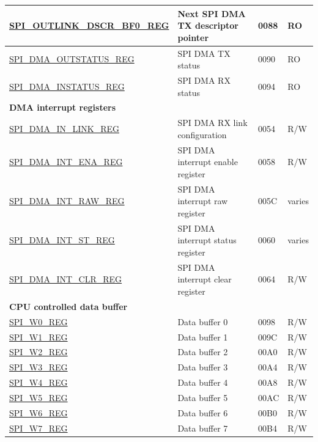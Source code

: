 \begin{longtable}{ | p{6cm} | p{7.2cm} | p{1.3cm} | p{1cm} | }
\hyperref[regdesc:SPIOUTLINKDSCRBF0REG]{SPI\_OUTLINK\_DSCR\_BF0\_REG} & Next SPI DMA TX descriptor pointer & \hexprefix{}0088 & RO \\ \hline
\hyperref[regdesc:SPIDMAOUTSTATUSREG]{SPI\_DMA\_OUTSTATUS\_REG} & SPI DMA TX status & \hexprefix{}0090 & RO \\ \hline
\hyperref[regdesc:SPIDMAINSTATUSREG]{SPI\_DMA\_INSTATUS\_REG} & SPI DMA RX status & \hexprefix{}0094 & RO \\ \hline
\multicolumn{4}{|l|}{\textbf{DMA interrupt registers}} \\ \hline
\hyperref[regdesc:SPIDMAINLINKREG]{SPI\_DMA\_IN\_LINK\_REG} & SPI DMA RX link configuration & \hexprefix{}0054 & R/W \\ \hline
\hyperref[regdesc:SPIDMAINTENAREG]{SPI\_DMA\_INT\_ENA\_REG} & SPI DMA interrupt enable register & \hexprefix{}0058 & R/W \\ \hline
\hyperref[regdesc:SPIDMAINTRAWREG]{SPI\_DMA\_INT\_RAW\_REG} & SPI DMA interrupt raw register & \hexprefix{}005C & varies \\ \hline
\hyperref[regdesc:SPIDMAINTSTREG]{SPI\_DMA\_INT\_ST\_REG} & SPI DMA interrupt status register & \hexprefix{}0060 & varies \\ \hline
\hyperref[regdesc:SPIDMAINTCLRREG]{SPI\_DMA\_INT\_CLR\_REG} & SPI DMA interrupt clear register & \hexprefix{}0064 & R/W \\ \hline
\multicolumn{4}{|l|}{\textbf{CPU controlled data buffer}} \\ \hline
\hyperref[regdesc:SPIW0REG]{SPI\_W0\_REG} & Data buffer 0 & \hexprefix{}0098 & R/W \\ \hline
\hyperref[regdesc:SPIW1REG]{SPI\_W1\_REG} & Data buffer 1 & \hexprefix{}009C & R/W \\ \hline
\hyperref[regdesc:SPIW2REG]{SPI\_W2\_REG} & Data buffer 2 & \hexprefix{}00A0 & R/W \\ \hline
\hyperref[regdesc:SPIW3REG]{SPI\_W3\_REG} & Data buffer 3 & \hexprefix{}00A4 & R/W \\ \hline
\hyperref[regdesc:SPIW4REG]{SPI\_W4\_REG} & Data buffer 4 & \hexprefix{}00A8 & R/W \\ \hline
\hyperref[regdesc:SPIW5REG]{SPI\_W5\_REG} & Data buffer 5 & \hexprefix{}00AC & R/W \\ \hline
\hyperref[regdesc:SPIW6REG]{SPI\_W6\_REG} & Data buffer 6 & \hexprefix{}00B0 & R/W \\ \hline
\hyperref[regdesc:SPIW7REG]{SPI\_W7\_REG} & Data buffer 7 & \hexprefix{}00B4 & R/W \\ \hline

\end{longtable}
